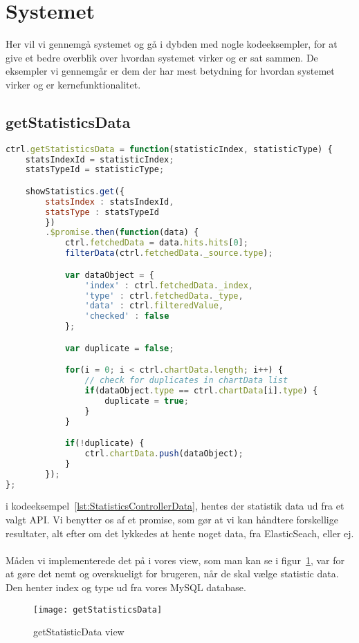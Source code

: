 \section{Systemet}
Her vil vi gennemgå systemet og gå i dybden med nogle kodeeksempler, for at give et bedre overblik over hvordan systemet virker og er sat sammen.
De eksempler vi gennemgår er dem der har mest betydning for hvordan systemet virker og er kernefunktionalitet.
\subsection{getStatisticsData}
\begin{lstlisting}[caption={getStatisticsData}, language={JavaScript}, label={lst:StatisticsControllerData}]
ctrl.getStatisticsData = function(statisticIndex, statisticType) {
    statsIndexId = statisticIndex;
    statsTypeId = statisticType;

    showStatistics.get({
        statsIndex : statsIndexId,
        statsType : statsTypeId
        })
        .$promise.then(function(data) {
            ctrl.fetchedData = data.hits.hits[0];
            filterData(ctrl.fetchedData._source.type);

            var dataObject = {
                'index' : ctrl.fetchedData._index,
                'type' : ctrl.fetchedData._type,
                'data' : ctrl.filteredValue,
                'checked' : false
            };

            var duplicate = false;

            for(i = 0; i < ctrl.chartData.length; i++) {
                // check for duplicates in chartData list
                if(dataObject.type == ctrl.chartData[i].type) {
                    duplicate = true;
                }
            }

            if(!duplicate) {
                ctrl.chartData.push(dataObject);
            }
        });
};
\end{lstlisting}
i kodeeksempel~\ref{lst:StatisticsControllerData}, hentes der statistik data ud fra et valgt API.
Vi benytter os af et promise, som gør at vi kan håndtere forskellige resultater, alt efter om det lykkedes at hente noget data, fra ElasticSeach, eller ej.
\\\\
Måden vi implementerede det på i vores view, som man kan se i figur~\ref{fig:getStatisticsData}, var for at gøre det nemt og overskueligt for brugeren,
når de skal vælge statistic data.
Den henter index og type ud fra vores MySQL database.
\begin{figure}[H]
\texttt{[image: getStatisticsData]}
\caption{getStatisticData view}
\label{fig:getStatisticsData}
\end{figure}
